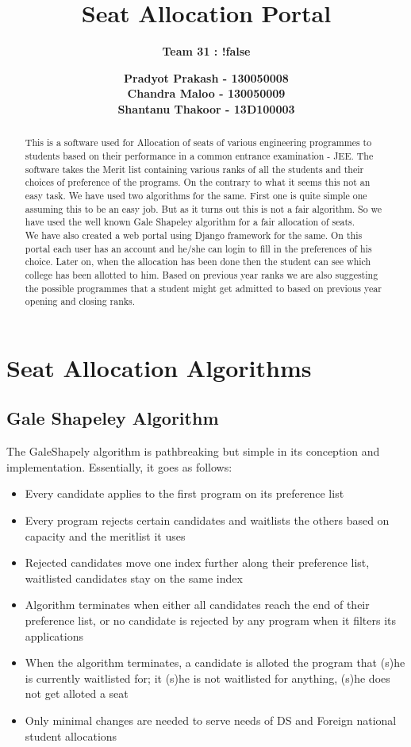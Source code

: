 \documentclass[]{report}
\begin{document}
\title{\Huge \bf{Seat Allocation Portal}   }
\author{\huge \bf{Team 31 : !false} }
\date{\huge \bf{ Pradyot Prakash - 130050008 \\ Chandra Maloo - 130050009 \\ Shantanu Thakoor - 13D100003}   }       
\maketitle
\Large{
\begin{abstract}
	This is a software used for Allocation of seats of various engineering programmes to students based on their performance in a common entrance examination - JEE.
	The software takes the Merit list containing various ranks of all the students and their choices of preference of the programs. On the contrary to what it seems this not an easy task. We have used two algorithms for the same. First one is quite simple one assuming this to be an easy job. But as it turns out this is not a fair algorithm. So we have used the well known Gale Shapeley algorithm for a fair allocation of seats. \\
	We have also created a web portal using Django framework for the same. On this portal each user has an account and he/she can login to fill in the preferences of his choice. Later on, when the allocation has been done then the student can see which college has been allotted to him. Based on previous year ranks we are also suggesting the possible programmes that a student might get admitted to based on previous year opening and closing ranks.
\end{abstract}
}

\chapter{Seat Allocation Algorithms}     
\section{Gale Shapeley Algorithm}  
The GaleShapely algorithm is pathbreaking but simple in its conception and implementation.
Essentially, it goes as follows:
\begin{itemize}
\item Every candidate applies to the first program on its preference list
\item Every program rejects certain candidates and waitlists the others based on capacity and the meritlist it uses
\item Rejected candidates move one index further along their preference list, waitlisted candidates stay on the same index
\item Algorithm terminates when either all candidates reach the end of their preference list, or no candidate is rejected by any program when it filters its applications
\item When the algorithm terminates, a candidate is alloted the program that (s)he is currently waitlisted for; it (s)he is not waitlisted for anything, (s)he does not get alloted a seat
\item Only minimal changes are needed to serve needs of DS and Foreign national student allocations
\end{itemize}
\end{document}
